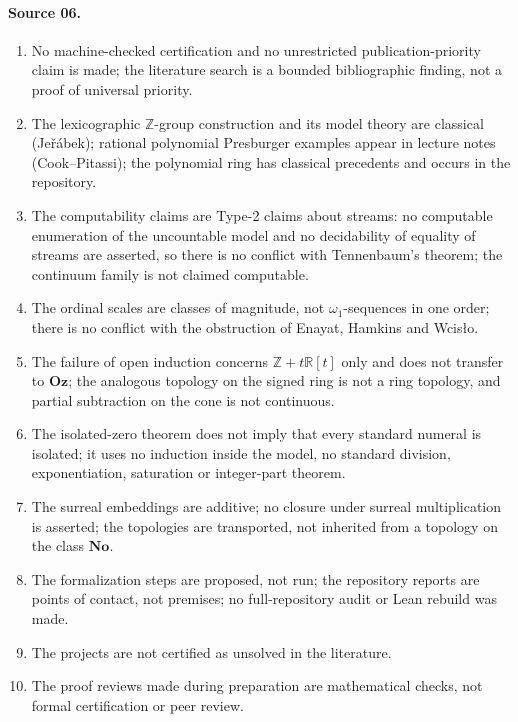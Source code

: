 \documentclass[11pt]{article}
\numberwithin{equation}{section}
\theoremstyle{definition}
\theoremstyle{remark}
\newcommand{\Z}{\mathbb Z}
\newcommand{\R}{\mathbb R}
\newcommand{\No}{\mathbf{No}}
\newcommand{\Oz}{\mathbf{Oz}}
\begin{document}
\paragraph{Source 06.}
\begin{enumerate}[label=06.\arabic*]
\item No machine-checked certification and no unrestricted
publication-priority claim is made; the literature search is a bounded
bibliographic finding, not a proof of universal priority.
\item The lexicographic $\Z$-group construction and its model theory are
classical (Je\v r\'abek); rational polynomial Presburger examples appear in
lecture notes (Cook--Pitassi); the polynomial ring has classical precedents
and occurs in the repository.
\item The computability claims are Type-2 claims about streams: no computable
enumeration of the uncountable model and no decidability of equality of
streams are asserted, so there is no conflict with Tennenbaum's theorem; the
continuum family is not claimed computable.
\item The ordinal scales are classes of magnitude, not $\omega_1$-sequences in
one order; there is no conflict with the obstruction of Enayat, Hamkins and
Wcis\l o.
\item The failure of open induction concerns $\Z+t\R[t]$ only and does not
transfer to $\Oz$; the analogous topology on the signed ring is not a ring
topology, and partial subtraction on the cone is not continuous.
\item The isolated-zero theorem does not imply that every standard numeral is
isolated; it uses no induction inside the model, no standard division,
exponentiation, saturation or integer-part theorem.
\item The surreal embeddings are additive; no closure under surreal
multiplication is asserted; the topologies are transported, not inherited
from a topology on the class $\No$.
\item The formalization steps are proposed, not run; the repository reports
are points of contact, not premises; no full-repository audit or Lean rebuild
was made.
\item The projects are not certified as unsolved in the literature.
\item The proof reviews made during preparation are mathematical checks, not
formal certification or peer review.
\end{enumerate}
\end{document}
